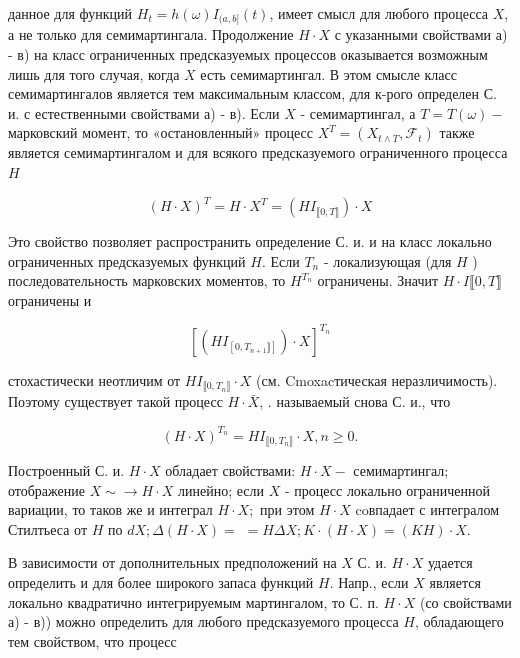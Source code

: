 \documentclass[10pt]{article}
\begin{document}
данное для функций $H_{t}=h(\omega) I_{(a, b]}(t)$, имеет смысл для любого процесса $X$, а не только для семимартингала. Продолжение $H \cdot X$ с указанными свойствами а) - в) на класс ограниченных предсказуемых процессов оказывается возможным лишь для того случая, когда $X$ есть семимартингал. В этом смысле класс семимартингалов является тем максимальным классом, для к-рого определен С. и. с естественными свойствами а) - в). Если $X$ - семимартингал, а $T=T(\omega)-$ марковский момент, то «остановленный» процесс $X^{T}=\left(X_{t \wedge T}, \mathscr{F}_{t}\right)$ также является семимартингалом и для всякого предсказуемого ограниченного процесса $H$



\[

(H \cdot X)^{T}=H \cdot X^{T}=\left(H I_{\llbracket 0, T \rrbracket}\right) \cdot X

\]



Это свойство позволяет распространить определение С. и. и на класс локально ограниченных предсказуемых функций $H$. Если $T_{n}$ - локализующая (для $H$ ) последовательность марковских моментов, то $H^{T_{n}}$ ограничены. Значит $H \cdot I \llbracket 0, T \rrbracket$ ограничены и



\[

\left[\left(H I_{\left[0, T_{n+1} \rrbracket\right]}\right) \cdot X\right]^{T_{n}}

\]



стохастически неотличим от $H I_{\llbracket 0, T_{n} \rrbracket} \cdot X$ (см. Cmoxacтическая неразличимость). Поэтому существует такой процесс $H \cdot \bar{X}$, . называемый снова С. и., что



\[

(H \cdot X)^{T_{n}}=H I_{\llbracket 0, T_{n} \rrbracket} \cdot X, n \geqslant 0 .

\]



Построенный С. и. $H \cdot X$ обладает свойствами: $H \cdot X-$ семимартингал; отображение $X \sim \rightarrow H \cdot X$ линейно; если $X$ - процесс локально ограниченной вариации, то таков же и интеграл $H \cdot X ;$ при этом $H \cdot X$ coвпадает с интегралом Стилтьеса от $H$ по $d X ; \Delta(H \cdot X)=$ $=H \Delta X ; K \cdot(H \cdot X)=(K H) \cdot X$.



В зависимости от дополнительных предположений на $X$ С. и. $H \cdot X$ удается определить и для более широкого запаса функций $H$. Напр., если $X$ является локально квадратично интегрируемым мартингалом, то С. п. $H \cdot X$ (со свойствами а) - в)) можно определить для любого предсказуемого процесса $H$, обладающего тем свойством, что процесс
\end{document}
